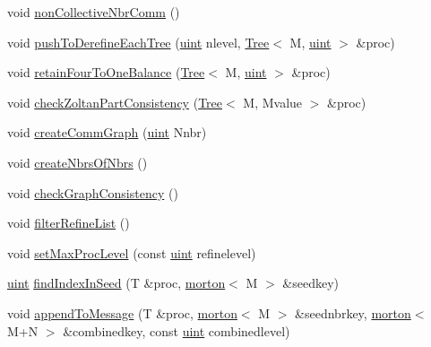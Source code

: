 \begin{DoxyCompactItemize}
\item 
void \mbox{\hyperlink{classTemplateForest_a67af26aae3ccfcca14be70be3d9553ee}{non\+Collective\+Nbr\+Comm}} ()
\item 
void \mbox{\hyperlink{classTemplateForest_a2d6eaf33be1cc4cc461c269e1d2c88dd}{push\+To\+Derefine\+Each\+Tree}} (\mbox{\hyperlink{definitions_8h_a69aa29b598b851b0640aa225a9e5d61d}{uint}} nlevel, \mbox{\hyperlink{classTree}{Tree}}$<$ M, \mbox{\hyperlink{definitions_8h_a69aa29b598b851b0640aa225a9e5d61d}{uint}} $>$ \&proc)
\item 
void \mbox{\hyperlink{classTemplateForest_a070fad5f90490ac39ae703c080dc989d}{retain\+Four\+To\+One\+Balance}} (\mbox{\hyperlink{classTree}{Tree}}$<$ M, \mbox{\hyperlink{definitions_8h_a69aa29b598b851b0640aa225a9e5d61d}{uint}} $>$ \&proc)
\item 
void \mbox{\hyperlink{classTemplateForest_a6081a7e6c224459b4f6e695a25c04d14}{check\+Zoltan\+Part\+Consistency}} (\mbox{\hyperlink{classTree}{Tree}}$<$ M, Mvalue $>$ \&proc)
\item 
void \mbox{\hyperlink{classTemplateForest_a5816e439571082d5a109ff626730159d}{create\+Comm\+Graph}} (\mbox{\hyperlink{definitions_8h_a69aa29b598b851b0640aa225a9e5d61d}{uint}} Nnbr)
\item 
void \mbox{\hyperlink{classTemplateForest_a0f899811a6c9edda8c8aa807393dd0bf}{create\+Nbrs\+Of\+Nbrs}} ()
\item 
void \mbox{\hyperlink{classTemplateForest_a3d2daa1c271c51f027b114fe56e9322e}{check\+Graph\+Consistency}} ()
\item 
void \mbox{\hyperlink{classTemplateForest_a76986ce40169fb0e9f517ebd538c98cf}{filter\+Refine\+List}} ()
\item 
void \mbox{\hyperlink{classTemplateForest_aca233428d2484e70653d21ddfd8bc790}{set\+Max\+Proc\+Level}} (const \mbox{\hyperlink{definitions_8h_a69aa29b598b851b0640aa225a9e5d61d}{uint}} refinelevel)
\item 
\mbox{\hyperlink{definitions_8h_a69aa29b598b851b0640aa225a9e5d61d}{uint}} \mbox{\hyperlink{classTemplateForest_a94408f59c9721a96092d96b273c5d6b7}{find\+Index\+In\+Seed}} (T \&proc, \mbox{\hyperlink{definitions_8h_af8682350bd8bb38ee9023f7a0a310add}{morton}}$<$ M $>$ \&seedkey)
\item 
void \mbox{\hyperlink{classTemplateForest_a14f94cdb193a07e4488e3463c73f99e9}{append\+To\+Message}} (T \&proc, \mbox{\hyperlink{definitions_8h_af8682350bd8bb38ee9023f7a0a310add}{morton}}$<$ M $>$ \&seednbrkey, \mbox{\hyperlink{definitions_8h_af8682350bd8bb38ee9023f7a0a310add}{morton}}$<$ M+N $>$ \&combinedkey, const \mbox{\hyperlink{definitions_8h_a69aa29b598b851b0640aa225a9e5d61d}{uint}} combinedlevel)

\end{DoxyCompactItemize}

